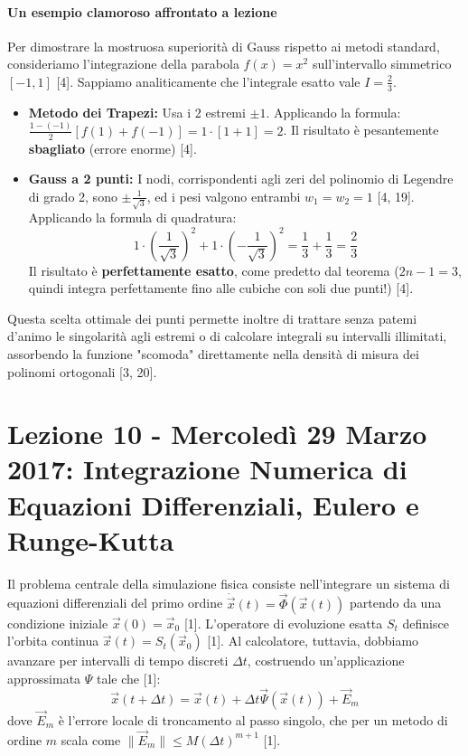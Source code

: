 \documentclass[12pt,a4paper]{article}
\begin{document}
\paragraph{Un esempio clamoroso affrontato a lezione}
Per dimostrare la mostruosa superiorità di Gauss rispetto ai metodi standard, consideriamo l'integrazione della parabola $f(x) = x^2$ sull'intervallo simmetrico $[-1, 1]$ [4]. Sappiamo analiticamente che l'integrale esatto vale $I = \frac{2}{3}$.
\begin{itemize}
    \item \textbf{Metodo dei Trapezi:} Usa i 2 estremi $\pm 1$. Applicando la formula: $\frac{1 - (-1)}{2} [f(1) + f(-1)] = 1 \cdot [1 + 1] = 2$. Il risultato è pesantemente \textbf{sbagliato} (errore enorme) [4].
    \item \textbf{Gauss a 2 punti:} I nodi, corrispondenti agli zeri del polinomio di Legendre di grado 2, sono $\pm \frac{1}{\sqrt{3}}$, ed i pesi valgono entrambi $w_1=w_2=1$ [4, 19]. Applicando la formula di quadratura: 
    \begin{equation*}
    1 \cdot \left(\frac{1}{\sqrt{3}}\right)^2 + 1 \cdot \left(-\frac{1}{\sqrt{3}}\right)^2 = \frac{1}{3} + \frac{1}{3} = \frac{2}{3}
    \end{equation*}
    Il risultato è \textbf{perfettamente esatto}, come predetto dal teorema ($2n-1 = 3$, quindi integra perfettamente fino alle cubiche con soli due punti!) [4].
\end{itemize}
Questa scelta ottimale dei punti permette inoltre di trattare senza patemi d'animo le singolarità agli estremi o di calcolare integrali su intervalli illimitati, assorbendo la funzione "scomoda" direttamente nella densità di misura dei polinomi ortogonali [3, 20].

\newpage
\section{Lezione 10 - Mercoledì 29 Marzo 2017: Integrazione Numerica di Equazioni Differenziali, Eulero e Runge-Kutta}

Il problema centrale della simulazione fisica consiste nell'integrare un sistema di equazioni differenziali del primo ordine $\dot{\vec{x}}(t) = \vec{\Phi}(\vec{x}(t))$ partendo da una condizione iniziale $\vec{x}(0) = \vec{x}_0$ [1]. L'operatore di evoluzione esatta $S_t$ definisce l'orbita continua $\vec{x}(t) = S_t(\vec{x}_0)$ [1]. 
Al calcolatore, tuttavia, dobbiamo avanzare per intervalli di tempo discreti $\Delta t$, costruendo un'applicazione approssimata $\Psi$ tale che [1]:
\begin{equation}
\vec{x}(t+\Delta t) = \vec{x}(t) + \Delta t \vec{\Psi}(\vec{x}(t)) + \vec{E}_m
\end{equation}
dove $\vec{E}_m$ è l'errore locale di troncamento al passo singolo, che per un metodo di ordine $m$ scala come $\|\vec{E}_m\| \le M(\Delta t)^{m+1}$ [1].
\end{document}
